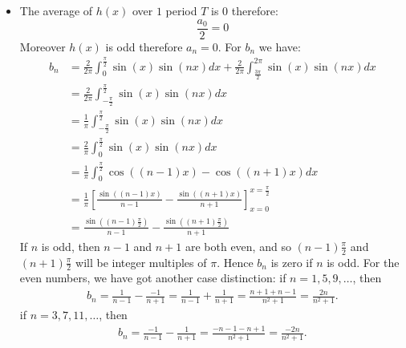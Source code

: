 \documentclass[11pt]{article}
\begin{document}
\begin{solution}
\begin{itemize}
\begin{align*}
\begin{cases}
                \end{cases}
            \right)
            \cdot 
            \left(
                \begin{cases}
                    -1 & \text{ if $n$ is odd } 
                    \\ 
                    1 & \text{ if $n$ is even } 
                \end{cases}
            \right)
            =  
            -\frac{2\pi^2}{n}+\frac{12}{n^3}
            .
    \end{align*}
    \item 
    The average of $h(x)$ over $1$ period $T$ is $0$ therefore:
    \[
        \frac{a_0}{2} = 0
    \]
    Moreover $h(x)$ is odd therefore $a_n = 0$. For $b_n$ we have:
    \begin{align*}
        b_n 
        &
        = 
        \frac{2}{2\pi}
        \int_{0}^{\frac{\pi}{2}} \sin(x) \sin(n x) dx
        +
        \frac{2}{2\pi}
        \int_{\frac{3\pi}{2}}^{2\pi} \sin(x) \sin(n x) dx
        \\&
        =
        \frac{2}{2\pi}
        \int_{-\frac{\pi}{2}}^{\frac{\pi}{2}} \sin(x) \sin(n x) dx
        \\&
        =
        \frac{1}{\pi}
        \int_{-\frac{\pi}{2}}^{\frac{\pi}{2}} \sin(x) \sin(n x) dx
        \\&
        =
        \frac{2}{\pi}
        \int_{0}^{\frac{\pi}{2}} \sin(x) \sin(n x) dx
        \\&
        =
        \frac{1}{\pi}
        \int_{0}^{\frac{\pi}{2}} \cos((n-1)x) - \cos((n+1)x) dx
        \\&
        =
        \frac{1}{\pi}
        \left[ \frac{\sin((n-1)x)}{n-1} - \frac{\sin((n+1)x)}{n+1}\right]_{x=0}^{x=\frac{\pi}{2}}
        \\&
        =
        \frac{\sin((n-1)\frac{\pi}{2})}{n-1} - \frac{\sin((n+1)\frac{\pi}{2})}{n+1}
    \end{align*}
    If $n$ is odd, then $n-1$ and $n+1$ are both even, and so $(n-1)\frac{\pi}{2}$ and $(n+1)\frac{\pi}{2}$ will be integer multiples of $\pi$. 
    Hence $b_n$ is zero if $n$ is odd. 
    For the even numbers, we have got another case distinction:
    if $n=1,5,9,\dots$, then 
    \begin{align*}
        b_n = \frac{1}{n-1} - \frac{-1}{n+1} = \frac{1}{n-1} + \frac{1}{n+1} = \frac{n+1+n-1}{n^2+1} = \frac{2n}{n^2+1}.
    \end{align*}
    if $n=3,7,11,\dots$, then 
    \begin{align*}
        b_n = \frac{-1}{n-1} - \frac{1}{n+1} = \frac{-n-1-n+1}{n^2+1} = \frac{-2n}{n^2+1}.
    \end{align*}
    

    
\end{itemize}
\end{solution}
\end{document}
